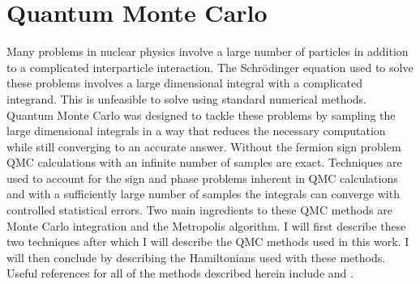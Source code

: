 \section{Quantum Monte Carlo}
Many problems in nuclear physics involve a large number of particles in addition to a complicated interparticle interaction. The Schr\"odinger equation used to solve these problems involves a large dimensional integral with a complicated integrand. This is unfeasible to solve using standard numerical methods. Quantum Monte Carlo was designed to tackle these problems by sampling the large dimensional integrals in a way that reduces the necessary computation while still converging to an accurate answer. Without the fermion sign problem QMC calculations with an infinite number of samples are exact. Techniques are used to account for the sign and phase problems inherent in QMC calculations and with a sufficiently large number of samples the integrals can converge with controlled statistical errors. Two main ingredients to these QMC methods are Monte Carlo integration and the Metropolis algorithm. I will first describe these two techniques after which I will describe the QMC methods used in this work. I will then conclude by describing the Hamiltonians used with these methods. Useful references for all of the methods described herein include \cite{carlson2015, foulkes2001} and \cite{pederiva2017}.

